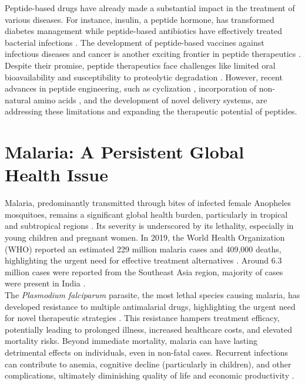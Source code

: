 Peptide-based drugs have already made a substantial impact in the treatment of various diseases. For
instance, insulin, a peptide hormone, has transformed diabetes management while peptide-based
antibiotics have effectively treated bacterial infections \cite{cesar2023adv}. The development of
peptide-based vaccines against infectious diseases and cancer is another exciting frontier in
peptide therapeutics \cite{purcell2007vaccine}. \\

Despite their promise, peptide therapeutics face challenges like limited oral bioavailability and
susceptibility to proteolytic degradation \cite{muttenthaler2021trends}. However, recent advances in
peptide engineering, such as cyclization \cite{hayes2021cycl}, incorporation of non-natural amino
acids \cite{li2022nonnat}, and the development of novel delivery systems, are addressing these
limitations and expanding the therapeutic potential of peptides.

\section{Malaria: A Persistent Global Health Issue} 
Malaria, predominantly transmitted through bites of infected female Anopheles mosquitoes, remains a
significant global health burden, particularly in tropical and subtropical regions
\cite{duguma2022ethiopia, ghosh2021malaria}. Its severity is underscored by its lethality,
especially in young children and pregnant women. In 2019, the World Health Organization (WHO)
reported an estimated 229 million malaria cases and 409,000 deaths, highlighting the urgent need for
effective treatment alternatives \cite{jain2022pregnancy}. Around 6.3 million cases were reported
from the Southeast Asia region, majority of cases were present in India
\cite{cristina2020pregnancy}. \\

The \textit{Plasmodium falciparum} parasite, the most lethal species causing malaria, has developed
resistance to multiple antimalarial drugs, highlighting the urgent need for novel therapeutic
strategies \cite{fairhurst2012artemisinin}. This resistance hampers treatment
efficacy, potentially leading to prolonged illness, increased healthcare costs, and elevated
mortality risks. Beyond immediate mortality, malaria can have lasting detrimental effects on
individuals, even in non-fatal cases. Recurrent infections can contribute to anemia, cognitive
decline (particularly in children), and other complications, ultimately diminishing quality of life
and economic productivity \cite{shukla2022super}. \\

